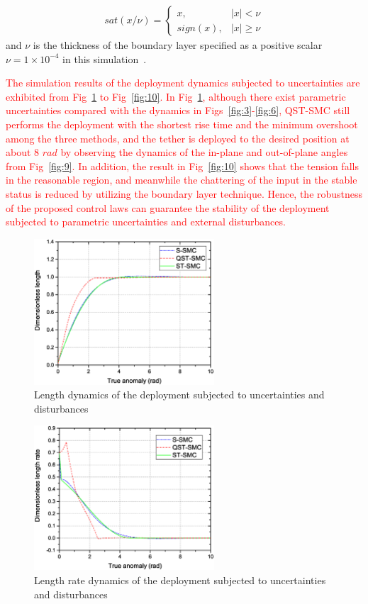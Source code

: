 \documentclass[3p]{elsarticle}
\theoremstyle{plain}
\theoremstyle{remark}
\begin{document}
{\begin{align}
sat(x/\nu)=
\begin{cases}
x,&\vert x\vert <\nu\\
sign(x),&\vert x\vert\ge\nu
\end{cases}
\end{align}
and $\nu$ is the thickness of the boundary layer specified as a positive scalar $\nu=1\times 10^{-4}$ in this simulation~\cite{1039802}.}\par
\textcolor{red}{
The simulation results of the deployment dynamics subjected to uncertainties are exhibited from Fig~\ref{fig:7} to Fig~\ref{fig:10}. In Fig~\ref{fig:7}, although there exist parametric uncertainties compared with the dynamics in Figs~\ref{fig:3}-\ref{fig:6}, QST-SMC still performs the deployment with the shortest rise time and the minimum overshoot among the three methods, and the tether is deployed to the desired position at about 8 $rad$ by observing the dynamics of the in-plane and out-of-plane angles from Fig~\ref{fig:9}. In addition, the result in Fig~\ref{fig:10} shows that the tension falls in the reasonable region, and meanwhile the chattering of the input in the stable status is reduced by utilizing the boundary layer technique. Hence, the robustness of the proposed control laws can guarantee the stability of the deployment subjected to parametric uncertainties and external disturbances.}
\begin{figure}
\centering
\includegraphics[width=0.6\textwidth]{paper4_fig7_20161025.eps}
\caption{Length dynamics of the deployment subjected to uncertainties and disturbances}
\label{fig:7}
\end{figure}
\begin{figure}
\centering
\includegraphics[width=0.6\textwidth]{paper4_fig8_20161025.eps}
\caption{Length rate dynamics of the deployment subjected to uncertainties and disturbances}
\label{fig:8}
\end{figure}
\end{document}
